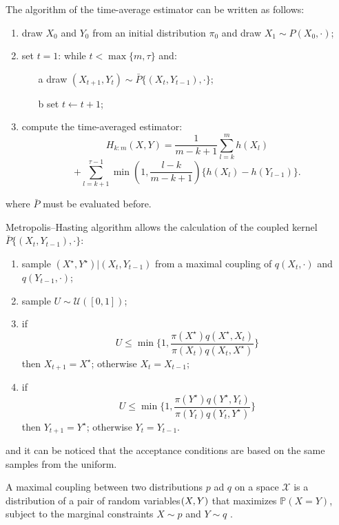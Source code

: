 \documentclass {article}
\begin{document}
The algorithm of the time-average estimator can be written as follows:
\begin{enumerate}
	\item draw $X_0$ and $Y_0$ from an initial distribution $\pi_0$ and draw $X_1 \sim P(X_0, \cdot)$;
	\item set $t=1$: while $t<\max\{m,\tau\}$ and:
	\begin{itemize}
		\item[a] draw $(X_{t+1}, Y_t)\sim \bar P \{(X_t, Y_{t-1}), \cdot \}$; %
		\item[b] set $t \leftarrow t+1$;
	\end{itemize}
	\item compute the time-averaged estimator:	 	$$
		H_{k:m}(X,Y)
		= \frac{1}{m-k+1}\sum_{l=k}^{m}h(X_l) $$
		$$
		+ \sum_{l=k+1}^{\tau -1}\min(1, \frac{l-k}{m-k+1})\{h(X_l)-h(Y_{l-1})\} .
		$$
	
\end{enumerate}
where $ \bar P$ must be evaluated before.


	Metropolis--Hasting algorithm allows the calculation of the coupled kernel $\bar P \{(X_t, Y_{t-1}), \cdot \}$:
	
	\begin{enumerate}
		\item sample $(X^\star, Y^\star) | (X_t, Y_{t-1})$ from a maximal coupling of $q(X_t, \cdot)$ and $q(Y_{t-1}, \cdot)$;
		\item sample $U \sim \mathcal{U}([0,1])$;
		\item if
		$$ U
		\leq \min\bigg \{
		1,
		\frac{ \pi(X^\star)q(X^\star,X_t)}{
			\pi(X_t)q(X_t, X^\star)}
		\bigg \}
		$$
		then $X_{t+1} = X^\star$; otherwise $X_t = X_{t-1}$;
		\item if
		$$ U
		\leq \min\bigg \{ 
		1,
		\frac{ \pi(Y^\star)q(Y^\star,Y_t)}{
			\pi(Y_t)q(Y_t, Y^\star)}
		\bigg \}
		$$
		then $Y_{t+1} = Y^\star$; otherwise $Y_t = Y_{t-1}$.
		
	\end{enumerate}

and it can be noticed that the acceptance conditions are based on the same samples from the uniform.

A maximal coupling between two distributions $p$ ad $q$ on a space $\mathcal{X}$ is a distribution of a pair of random variables$(X, \space Y)$ that maximizes $\mathbb{P}(X=Y)$, subject to the marginal constraints $X\sim p$ and $Y \sim q$ \cite{zhang2020markov} \cite{Cordaro2017past}.
\end{document}
